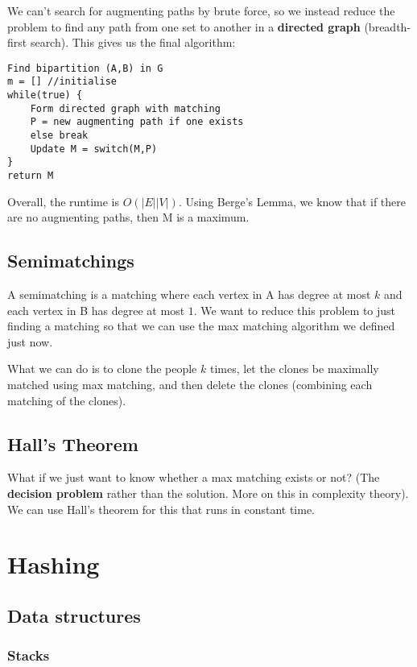 \documentclass[11pt,fleqn,a4paper,titlepage,dvipsnames,cmyk]{scrartcl}
\begin{document}
We can't search for augmenting paths by brute force, so we instead reduce
the problem to find any path from one set to another in a \textbf{directed
graph} (breadth-first search). This gives us the final algorithm:

\begin{lstlisting}
Find bipartition (A,B) in G
m = [] //initialise
while(true) {
    Form directed graph with matching
    P = new augmenting path if one exists
    else break
    Update M = switch(M,P)
}
return M
\end{lstlisting}

Overall, the runtime is $O(|E||V|)$. Using Berge's Lemma, we know that if
there are no augmenting paths, then M is a maximum.

\subsection{Semimatchings}%
\label{sub:Semimatchings}
A semimatching is a matching where each vertex in A has degree at most $k$
and each vertex in B has degree at most $1$. We want to reduce this
problem to just finding a matching so that we can use the max matching
algorithm we defined just now.

What we can do is to clone the people $k$ times, let the clones be
maximally matched using max matching, and then delete the clones
(combining each matching of the clones).

\subsection{Hall's Theorem}%
\label{sub:Hall's Theorem}
What if we just want to know whether a max matching exists or not? (The
\textbf{decision problem} rather than the solution. More on this in
complexity theory). We can use Hall's theorem for this that runs in
constant time.

\section{Hashing}%
\label{sec:Hashing}

\subsection{Data structures}%
\label{sub:data-structs}
\subsubsection{Stacks}%
\label{ssub:Stacks}
\end{document}
